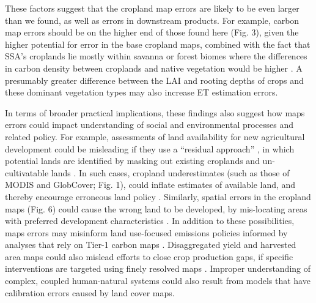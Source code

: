 \documentclass[a4paper]{article}
\begin{document}
These factors suggest that the cropland map errors are likely to be even larger than we found, as well as errors in downstream products. For example, carbon map errors should be on the higher end of those found here (Fig. 3), given the higher potential for error in the base cropland maps, combined with the fact that SSA's croplands lie mostly within savanna or forest biomes where the differences in carbon density between croplands and native vegetation would be higher \citep{searchinger_high_2015}. A presumably greater difference between the LAI and rooting depths of crops and these dominant vegetation types may also increase ET estimation errors.  

In terms of broader practical implications, these findings also suggest how maps errors could impact understanding of social and environmental processes and related policy. For example, assessments of land availability for new agricultural development could be misleading if they use a ``residual approach'' \citep{lambin_estimating_2013}, in which potential lands are identified by masking out existing croplands and un-cultivatable lands \citep[e.g.][]{estes_reconciling_2016}. In such cases, cropland underestimates (such as those of MODIS and GlobCover; Fig. 1), could inflate estimates of available land, and thereby encourage erroneous land policy \citep{rulli_global_2013}. Similarly, spatial errors in the cropland maps (Fig. 6) could cause the wrong land to be developed, by mis-locating areas with preferred development characteristics \citep[e.g. high agricultural potential and low environmental cost;][]{estes_reconciling_2016, gasparri_emerging_2015}. In addition to these possibilities, maps errors may misinform land use-focused emissions policies informed by analyses that rely on Tier-1 carbon maps \citep[e.g.][]{phelps_agricultural_2013,cattaneo_international_2010}. Disaggregated yield and harvested area maps could also mislead efforts to close crop production gaps, if specific interventions are targeted using finely resolved maps \citep[e.g. the 10 km map shown in Figure 3 in ][]{foley_solutions_2011}. Improper understanding of complex, coupled human-natural systems could also result from models that have calibration errors caused by land cover maps. 

\vspace{-0.3 cm}
\end{document}
